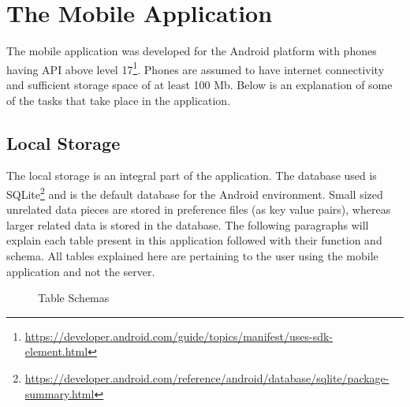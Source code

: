 \section{The Mobile Application}

The mobile application was developed for the Android platform with phones having API above level 17\footnote{\url{https://developer.android.com/guide/topics/manifest/uses-sdk-element.html}}. Phones are assumed to have internet connectivity and sufficient storage space of at least 100 Mb.
Below is an explanation of some of the tasks that take place in the application.

\subsection{Local Storage} \label{loc}
The local storage is an integral part of the application. The database used is SQLite\footnote{\url{https://developer.android.com/reference/android/database/sqlite/package-summary.html}} and is the default database
for the Android environment. Small sized unrelated data pieces are stored in preference files (as key value pairs), whereas larger related
data is stored in the database. The following paragraphs will explain each table present in this application followed with 
their function and schema. All tables explained here are pertaining to the user using the mobile application and not the server.

\begin{figure}[htp]
\hspace{1em}
\caption{Table Schemas}
\label{fig:ts1}
\end{figure}


